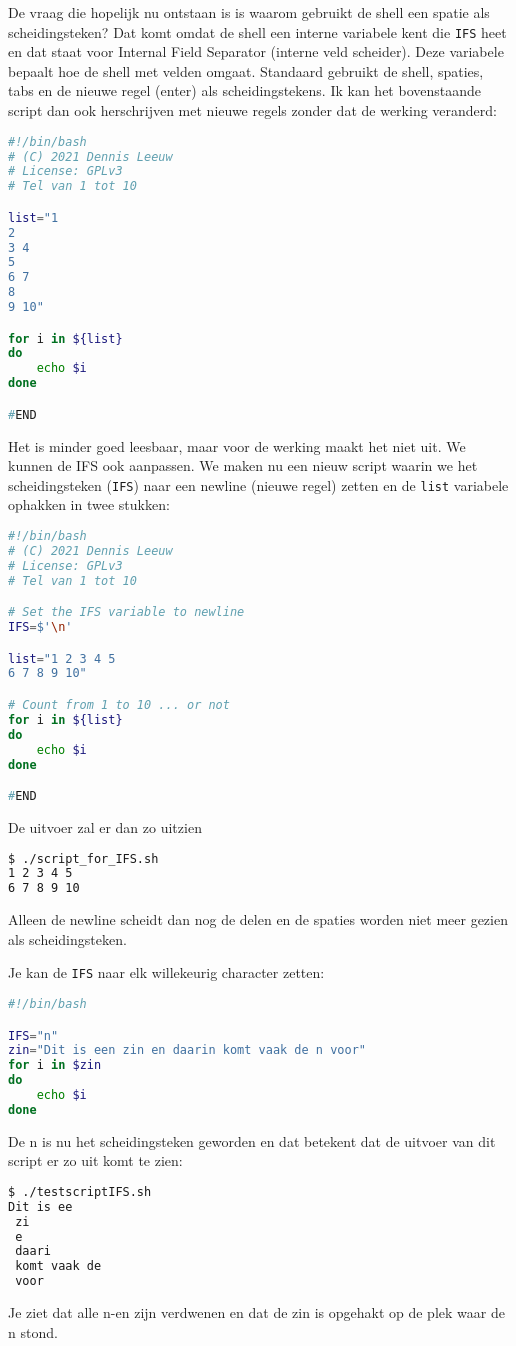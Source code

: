 De vraag die hopelijk nu ontstaan is is waarom gebruikt de shell een spatie als scheidingsteken? Dat komt omdat de shell een interne variabele kent die \texttt{IFS} heet en dat staat voor Internal Field Separator (interne veld scheider). Deze variabele bepaalt hoe de shell met velden omgaat. Standaard gebruikt de shell, spaties, tabs en de nieuwe regel (enter) als scheidingstekens. Ik kan het bovenstaande script dan ook herschrijven met nieuwe regels zonder dat de werking veranderd:
\begin{lstlisting}[language=bash]
#!/bin/bash
# (C) 2021 Dennis Leeuw
# License: GPLv3
# Tel van 1 tot 10

list="1
2
3 4
5
6 7
8
9 10"

for i in ${list}
do
	echo $i
done

#END
\end{lstlisting}
Het is minder goed leesbaar, maar voor de werking maakt het niet uit. We kunnen de IFS ook aanpassen. We maken nu een nieuw script waarin we het scheidingsteken (\texttt{IFS}) naar een newline (nieuwe regel) zetten en de \texttt{list} variabele ophakken in twee stukken:
\begin{lstlisting}[language=bash]
#!/bin/bash
# (C) 2021 Dennis Leeuw
# License: GPLv3
# Tel van 1 tot 10

# Set the IFS variable to newline
IFS=$'\n'

list="1 2 3 4 5
6 7 8 9 10"

# Count from 1 to 10 ... or not
for i in ${list}
do
	echo $i
done

#END
\end{lstlisting}
De uitvoer zal er dan zo uitzien
\begin{lstlisting}[language=bash]
$ ./script_for_IFS.sh 
1 2 3 4 5
6 7 8 9 10
\end{lstlisting}
Alleen de newline scheidt dan nog de delen en de spaties worden niet meer gezien als scheidingsteken.

Je kan de \texttt{IFS} naar elk willekeurig character zetten:
\begin{lstlisting}[language=bash]
#!/bin/bash

IFS="n"
zin="Dit is een zin en daarin komt vaak de n voor"
for i in $zin
do
	echo $i
done
\end{lstlisting}
De n is nu het scheidingsteken geworden en dat betekent dat de uitvoer van dit script er zo uit komt te zien:
\begin{lstlisting}[language=bash]
$ ./testscriptIFS.sh
Dit is ee
 zi
 e
 daari
 komt vaak de
 voor
\end{lstlisting}
Je ziet dat alle n-en zijn verdwenen en dat de zin is opgehakt op de plek waar de n stond.
